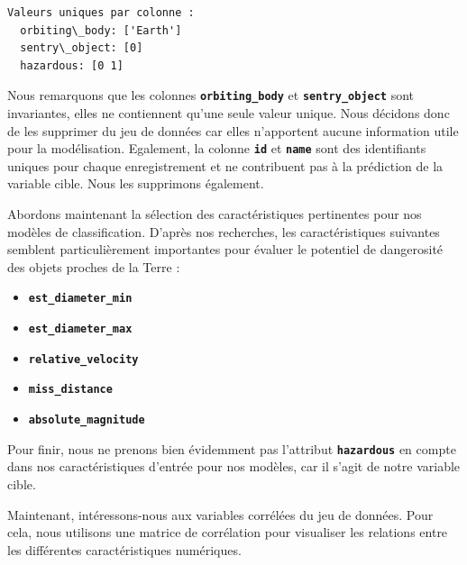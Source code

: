 \documentclass[11pt]{article}
\providecommand{\tightlist}{%
      \setlength{\itemsep}{0pt}\setlength{\parskip}{0pt}}
\begin{document}
\begin{Verbatim}[commandchars=\\\{\}]
  Valeurs uniques par colonne :
  orbiting\_body: ['Earth']
  sentry\_object: [0]
  hazardous: [0 1]
\end{Verbatim}

Nous remarquons que les colonnes \textbf{\texttt{orbiting\_body}} et
\textbf{\texttt{sentry\_object}} sont invariantes, elles ne contiennent
qu'une seule valeur unique. Nous décidons donc de les supprimer du jeu
de données car elles n'apportent aucune information utile pour la
modélisation. Egalement, la colonne \textbf{\texttt{id}} et
\textbf{\texttt{name}} sont des identifiants uniques pour chaque
enregistrement et ne contribuent pas à la prédiction de la variable
cible. Nous les supprimons également.

Abordons maintenant la sélection des caractéristiques pertinentes pour
nos modèles de classification. D'après nos recherches, les
caractéristiques suivantes semblent particulièrement importantes pour
évaluer le potentiel de dangerosité des objets proches de la Terre :

\begin{itemize}
  \tightlist
  \item
        \textbf{\texttt{est\_diameter\_min}}
  \item
        \textbf{\texttt{est\_diameter\_max}}
  \item
        \textbf{\texttt{relative\_velocity}}
  \item
        \textbf{\texttt{miss\_distance}}
  \item
        \textbf{\texttt{absolute\_magnitude}}
\end{itemize}

Pour finir, nous ne prenons bien évidemment pas l'attribut
\textbf{\texttt{hazardous}} en compte dans nos caractéristiques d'entrée
pour nos modèles, car il s'agit de notre variable cible.

Maintenant, intéressons-nous aux variables corrélées du jeu de données.
Pour cela, nous utilisons une matrice de corrélation pour visualiser les
relations entre les différentes caractéristiques numériques.

\begin{center}
\end{center}
{ \hspace*{\fill} \\}
\end{document}
